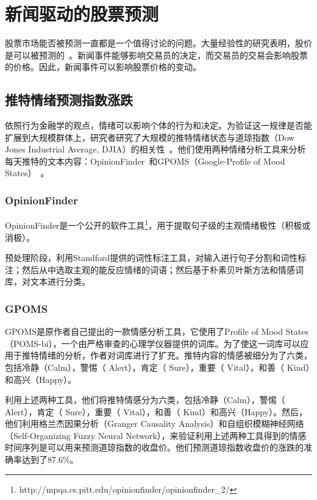 \section{新闻驱动的股票预测}

股票市场能否被预测一直都是一个值得讨论的问题。大量经验性的研究表明，股价是可以被预测的~\cite{bollen2011twitter,ding2014using,ding2015deep,ding2016knowledge-driven}。新闻事件能够影响交易员的决定，而交易员的交易会影响股票的价格。因此，新闻事件可以影响股票价格的变动。

\subsection{推特情绪预测指数涨跌}
依照行为金融学的观点，情绪可以影响个体的行为和决定。为验证这一规律是否能扩展到大规模群体上，研究者研究了大规模的推特情绪状态与道琼指数（Dow Jones Industrial Average, DJIA）的相关性~\cite{bollen2011twitter}。他们使用两种情绪分析工具来分析每天推特的文本内容：OpinionFinder~\cite{Wilson2005OpinionFinder}和GPOMS（Google-Profile of Mood States）~\cite{Spielberger1972Profile}。

\subsubsection{OpinionFinder}
OpinionFinder是一个公开的软件工具\footnote{http://mpqa.cs.pitt.edu/opinionfinder/opinionfinder\_2/}，用于提取句子级的主观情绪极性（积极或消极）。

预处理阶段，利用Standford提供的词性标注工具，对输入进行句子分割和词性标注；然后从中选取主观的能反应情绪的词语；然后基于朴素贝叶斯方法和情感词库，对文本进行分类。

\subsubsection{GPOMS}

GPOMS是原作者自己提出的一款情感分析工具，它使用了Profile of Mood States（POMS-bi），一个由严格审查的心理学仪器提供的词库。为了使这一词库可以应用于推特情绪的分析，作者对词库进行了扩充。推特内容的情感被细分为了六类，包括冷静（Calm），警惕（ Alert），肯定（ Sure），重要（ Vital），和善（ Kind）和高兴（Happy）。

利用上述两种工具，他们将推特情感分为六类，包括冷静（Calm），警惕（ Alert），肯定（ Sure），重要（ Vital），和善（ Kind）和高兴（Happy）。然后，他们利用格兰杰因果分析（Granger Causality Analysis）和自组织模糊神经网络（Self-Organizing Fuzzy Neural Network），来验证利用上述两种工具得到的情感时间序列是可以用来预测道琼指数的收盘价。他们预测道琼指数收盘价的涨跌的准确率达到了87.6\%。


